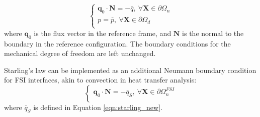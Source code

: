 \documentclass[oneside,11pt,times]{book}
\begin{document}
\begin{equation}
\begin{cases}
\bm{q}_0\cdot\bm{N}=-\bar{q}, \: \forall \bm{X} \in \partial \Omega_n\\
p=\bar{p}, \: \forall \bm{X} \in \partial \Omega_d\\
\end{cases}
\label{eqn:boundaryconditions}
\end{equation}
where $\bm{q}_0$ is the flux vector in the reference frame, and $\bm{N}$ is the normal to the boundary in the reference configuration. The boundary conditions for the mechanical degree of freedom are left unchanged.

Starling's law can be implemented as an additional Neumann boundary condition for FSI interfaces, akin to convection in heat transfer analysis:
\begin{equation}
\begin{cases}
\bm{q}_0\cdot\bm{N}=-\bar{q}_S, \: \forall \bm{X} \in \partial \Omega_{n}^{FSI} \\
\end{cases}
\label{eqn:starling_bc}
\end{equation}
where $\bar{q}_S$ is defined in Equation \eqref{eqn:starling_new}.
\end{document}
